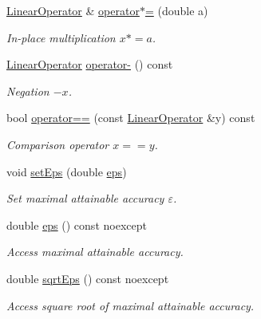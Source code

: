 \begin{DoxyCompactItemize}
\hyperlink{classSpacy_1_1FEniCS_1_1LinearOperator}{Linear\+Operator} \& \hyperlink{classSpacy_1_1SupportedOperatorBase_a15adabb20b53d84a79982b0668a67f68_a15adabb20b53d84a79982b0668a67f68}{operator$\ast$=} (double a)
\begin{DoxyCompactList}\small\item\em In-\/place multiplication $ x*=a$. \end{DoxyCompactList}\item 
\hyperlink{classSpacy_1_1FEniCS_1_1LinearOperator}{Linear\+Operator} \hyperlink{classSpacy_1_1SupportedOperatorBase_a0adcaddc24efbbdccbd891df99971c6c_a0adcaddc24efbbdccbd891df99971c6c}{operator-\/} () const
\begin{DoxyCompactList}\small\item\em Negation $ -x$. \end{DoxyCompactList}\item 
bool \hyperlink{classSpacy_1_1SupportedOperatorBase_aa493a6ea82feb3480a1c83395a0a7c3a_aa493a6ea82feb3480a1c83395a0a7c3a}{operator==} (const \hyperlink{classSpacy_1_1FEniCS_1_1LinearOperator}{Linear\+Operator} \&y) const
\begin{DoxyCompactList}\small\item\em Comparison operator $ x==y$. \end{DoxyCompactList}\item 
void \hyperlink{classSpacy_1_1Mixin_1_1Eps_a1bbfd62541610d5d80f2782ab77158e4_a1bbfd62541610d5d80f2782ab77158e4}{set\+Eps} (double \hyperlink{classSpacy_1_1Mixin_1_1Eps_a40e2ba8f3abd2b5370ef41238cfaaf8b_a40e2ba8f3abd2b5370ef41238cfaaf8b}{eps})
\begin{DoxyCompactList}\small\item\em Set maximal attainable accuracy $\varepsilon$. \end{DoxyCompactList}\item 
double \hyperlink{classSpacy_1_1Mixin_1_1Eps_a40e2ba8f3abd2b5370ef41238cfaaf8b_a40e2ba8f3abd2b5370ef41238cfaaf8b}{eps} () const noexcept
\begin{DoxyCompactList}\small\item\em Access maximal attainable accuracy. \end{DoxyCompactList}\item 
double \hyperlink{classSpacy_1_1Mixin_1_1Eps_a29e8c25dc3f1fdede57b8eb06f520fe1_a29e8c25dc3f1fdede57b8eb06f520fe1}{sqrt\+Eps} () const noexcept
\begin{DoxyCompactList}\small\item\em Access square root of maximal attainable accuracy. \end{DoxyCompactList}\item 

\end{DoxyCompactItemize}
